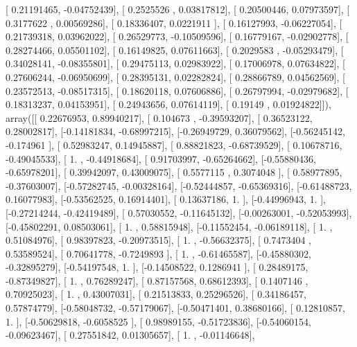 \documentclass{article}
\begin{document}
       [ 0.21191465, -0.04752439],
       [ 0.2525526 ,  0.03817812],
       [ 0.20500446,  0.07973597],
       [ 0.3177622 ,  0.00569286],
       [ 0.18336407,  0.0221911 ],
       [ 0.16127993, -0.06227054],
       [ 0.21739318,  0.03962022],
       [ 0.26529773, -0.10509596],
       [ 0.16779167, -0.02902778],
       [ 0.28274466,  0.05501102],
       [ 0.16149825,  0.07611663],
       [ 0.2029583 , -0.05293479],
       [ 0.34028141, -0.08355801],
       [ 0.29475113,  0.02983922],
       [ 0.17006978,  0.07634822],
       [ 0.27606244, -0.06950699],
       [ 0.28395131,  0.02282824],
       [ 0.28866789,  0.04562569],
       [ 0.23572513, -0.08517315],
       [ 0.18620118,  0.07606886],
       [ 0.26797994, -0.02979682],
       [ 0.18313237,  0.04153951],
       [ 0.24943656,  0.07614119],
       [ 0.19149   ,  0.01924822]]), array([[ 0.22676953,  0.89940217],
       [ 0.104673  , -0.39593207],
       [ 0.36523122,  0.28002817],
       [-0.14181834, -0.68997215],
       [-0.26949729,  0.36079562],
       [-0.56245142, -0.174961  ],
       [ 0.52983247,  0.14945887],
       [ 0.88821823, -0.68739529],
       [ 0.10678716, -0.49045533],
       [ 1.        , -0.44918684],
       [ 0.91703997, -0.65264662],
       [-0.55880436, -0.65978201],
       [ 0.39942097,  0.43009075],
       [ 0.5577115 ,  0.3074048 ],
       [ 0.58977895, -0.37603007],
       [-0.57282745, -0.00328164],
       [-0.52444857, -0.65369316],
       [-0.61488723,  0.16077983],
       [-0.53562525,  0.16914401],
       [ 0.13637186,  1.        ],
       [-0.44996943,  1.        ],
       [-0.27214244, -0.42419489],
       [ 0.57030552, -0.11645132],
       [-0.00263001, -0.52053993],
       [-0.45802291,  0.08503061],
       [ 1.        ,  0.58815948],
       [-0.11552454, -0.06189118],
       [ 1.        ,  0.51084976],
       [ 0.98397823, -0.20973515],
       [ 1.        , -0.56632375],
       [ 0.7473404 ,  0.53589524],
       [ 0.70641778, -0.7249893 ],
       [ 1.        , -0.61465587],
       [-0.45880302, -0.32895279],
       [-0.54197548,  1.        ],
       [-0.14508522,  0.1286941 ],
       [ 0.28489175, -0.87349827],
       [ 1.        ,  0.76289247],
       [ 0.87157568,  0.68612393],
       [ 0.1407146 ,  0.70925023],
       [ 1.        ,  0.43007031],
       [ 0.21513833,  0.25296526],
       [ 0.34186457,  0.57874779],
       [-0.58048732, -0.57179067],
       [-0.50471401,  0.38680166],
       [ 0.12810857,  1.        ],
       [-0.50629818, -0.6058525 ],
       [ 0.98989155, -0.51723836],
       [-0.54060154, -0.09623467],
       [ 0.27551842,  0.01305657],
       [ 1.        , -0.01146648],
\end{document}
